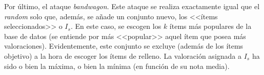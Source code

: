 Por último, el ataque \textit{bandwagon}. Este ataque se realiza exactamente igual que el \textit{random} solo que, además, se añade un conjunto nuevo, los <<ítems seleccionados>> o $I_s$. En este caso, se escogen los $k$ ítems más populares de la base de datos (se entiende por más <<popular>> aquel ítem que posea más valoraciones). Evidentemente, este conjunto se excluye (además de los ítems objetivo) a la hora de escoger los ítems de relleno. La valoración asignada a $I_s$ ha sido o bien la máxima, o bien la mínima (en función de su nota media).














